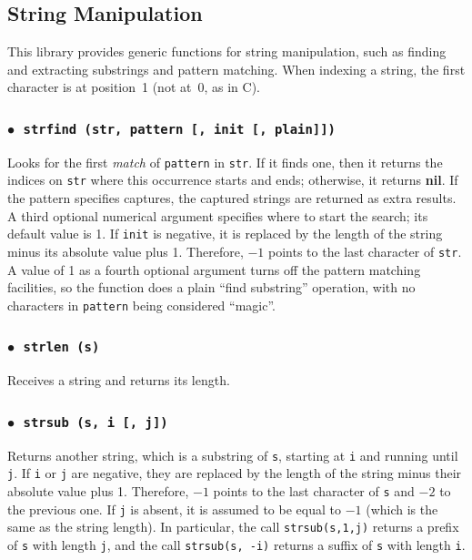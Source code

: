 \documentclass[11pt]{article}
\newcommand{\T}[1]{{\tt #1}}
\newcommand{\Math}[1]{$#1$}
\newcommand{\nil}{{\bf nil}}
\newcommand{\Deffunc}[1]{\index{#1}}
\newcommand{\ff}{$\bullet$\ }
\begin{document}
\subsection{String Manipulation}
This library provides generic functions for string manipulation,
such as finding and extracting substrings and pattern matching.
When indexing a string, the first character is at position~1
(not at~0, as in C).

\subsubsection*{\ff \T{strfind (str, pattern [, init [, plain]])}}
\Deffunc{strfind}
Looks for the first \emph{match} of
\verb|pattern| in \verb|str|.
If it finds one, then it returns the indices on \verb|str|
where this occurrence starts and ends;
otherwise, it returns \nil.
If the pattern specifies captures,
the captured strings are returned as extra results.
A third optional numerical argument specifies where to start the search;
its default value is 1.
If \verb|init| is negative,
it is replaced by the length of the string minus its
absolute value plus 1.
Therefore, \Math{-1} points to the last character of \verb|str|.
A value of 1 as a fourth optional argument
turns off the pattern matching facilities,
so the function does a plain ``find substring'' operation,
with no characters in \verb|pattern| being considered ``magic''.

\subsubsection*{\ff \T{strlen (s)}}\Deffunc{strlen}
Receives a string and returns its length.

\subsubsection*{\ff \T{strsub (s, i [, j])}}\Deffunc{strsub}
Returns another string, which is a substring of \verb|s|,
starting at \verb|i|  and running until \verb|j|.
If \verb|i| or \verb|j| are negative,
they are replaced by the length of the string minus their
absolute value plus 1.
Therefore, \Math{-1} points to the last character of \verb|s|
and \Math{-2} to the previous one.
If \verb|j| is absent, it is assumed to be equal to \Math{-1}
(which is the same as the string length).
In particular,
the call \verb|strsub(s,1,j)| returns a prefix of \verb|s|
with length \verb|j|,
and the call \verb|strsub(s, -i)| returns a suffix of \verb|s|
with length \verb|i|.
\end{document}
